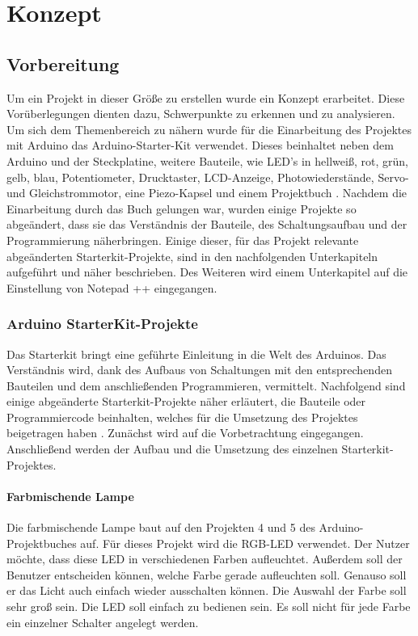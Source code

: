 \chapter{Konzept}

\section{Vorbereitung}

Um ein Projekt in dieser Größe zu erstellen wurde ein Konzept erarbeitet. Diese Vorüberlegungen dienten dazu, Schwerpunkte zu erkennen und zu analysieren. Um sich dem Themenbereich zu nähern wurde für die Einarbeitung des Projektes mit Arduino das Arduino-Starter-Kit verwendet. Dieses beinhaltet neben dem Arduino und der Steckplatine, weitere Bauteile, wie LED’s in hellweiß, rot, grün, gelb, blau, Potentiometer, Drucktaster, LCD-Anzeige, Photowiederstände, Servo- und Gleichstrommotor, eine Piezo-Kapsel und einem Projektbuch %
. Nachdem die Einarbeitung durch das Buch gelungen war, wurden einige Projekte so abgeändert, dass sie das Verständnis der Bauteile, des Schaltungsaufbau und der Programmierung näherbringen. Einige dieser, für das Projekt relevante abgeänderten Starterkit-Projekte, sind in den nachfolgenden Unterkapiteln aufgeführt und näher beschrieben. Des Weiteren wird einem Unterkapitel auf die Einstellung von Notepad ++ eingegangen.


\subsection{Arduino StarterKit-Projekte}


Das Starterkit bringt eine geführte Einleitung in die Welt des Arduinos. Das Verständnis wird, dank des Aufbaus von
Schaltungen mit den entsprechenden Bauteilen und dem anschließenden Programmieren,
vermittelt. Nachfolgend sind einige abgeänderte Starterkit-Projekte näher erläutert, die Bauteile oder Programmiercode beinhalten, welches für die Umsetzung des Projektes beigetragen haben . Zunächst wird auf die Vorbetrachtung eingegangen. Anschließend werden der Aufbau und die Umsetzung des einzelnen Starterkit-Projektes.




\subsubsection{Farbmischende Lampe}

Die farbmischende Lampe baut auf den Projekten 4 und 5 des Arduino-Projektbuches auf. Für dieses Projekt wird die RGB-LED verwendet. Der Nutzer möchte, dass diese LED in verschiedenen Farben aufleuchtet. Außerdem soll der Benutzer entscheiden können, welche Farbe gerade aufleuchten soll. Genauso soll er das Licht auch einfach wieder ausschalten können. Die Auswahl der Farbe soll sehr groß sein. Die LED soll einfach zu bedienen sein. Es soll nicht für jede Farbe ein einzelner Schalter angelegt werden.


